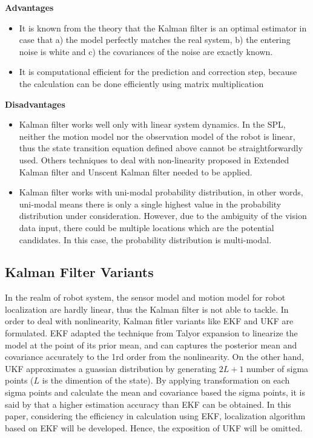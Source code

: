 \noindent\textbf{Advantages}
\begin{itemize}
  \item  It is known from the theory that the Kalman filter is an optimal estimator in case that a) the model perfectly matches the real system, b) the entering noise is white and c) the covariances of the noise are exactly known.
  \item  It is computational efficient for the prediction and correction step, because the calculation can be done efficiently using matrix multiplication
\end{itemize}

\noindent\textbf{Disadvantages}
\begin{itemize}
  \item  Kalman filter works well only with linear system dynamics. In the SPL, neither the motion model nor the observation model of the robot is linear, thus the state transition equation defined above cannot be straightforwardly used. Others techniques to deal with non-linearity proposed in Extended Kalman filter and Unscent Kalman filter needed to be applied.
  \item  Kalman filter works with uni-modal probability distribution, in other words, uni-modal means there is only a single highest value in the probability distribution under consideration. However, due to the ambiguity of the vision data input, there could be multiple locations which are the potential candidates. In this case, the probability distribution is multi-modal.
\end{itemize}

\subsection{Kalman Filter Variants}
In the realm of robot system, the sensor model and motion model for robot localization are hardly linear, thus the Kalman filter is not able to tackle. In order to deal with nonlinearity, Kalman fitler variants like \gls{EKF} and \gls{UKF} are formulated. \gls{EKF} adapted the technique from Talyor expansion to linearize the model at the point of its prior mean, and can captures the posterior mean and covariance accurately to the 1rd order from the nonlinearity. On the other hand, \gls{UKF} approximates a guassian distribution by generating $2L+1$ number of sigma points ($L$ is the dimention of the state). By applying transformation on each sigma points and calculate the mean and covariance based the sigma points, it is said by \cite{Wan2000} that a higher estimation accuracy than \gls{EKF} can be obtained. In this paper, considering the efficiency in calculation using \gls{EKF}, localization algorithm based on \gls{EKF} will be developed. Hence, the exposition of \gls{UKF} will be omitted.

